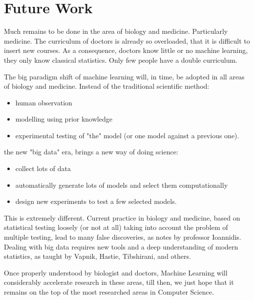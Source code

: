 \chapter{Future Work}
Much remains to be done in the area of biology and medicine. Particularly medicine. The curriculum of doctors is already so overloaded, that it is difficult to insert new courses. As a consequence, doctors know little or no machine learning, they only know classical statistics. Only few people have a double curriculum.

The big paradigm shift of machine learning will, in time, be adopted in all areas of biology and medicine. Instead of the traditional scientific method:
\begin{itemize}
\item human observation
\item modelling using prior knowledge
\item experimental testing of "the" model (or one model against a previous one).
\end{itemize}
the new "big data" era, brings a new way of doing science:
\begin{itemize}
\item collect lots of data
\item automatically generate lots of models and select them computationally
\item design new experiments to test a few selected models.
\end{itemize}
This is extremely different. Current practice in biology and medicine, based on statistical testing loosely (or not at all) taking into account the problem of multiple testing, lead to many false discoveries, as notes by professor Ioannidis. Dealing with big data requires new tools and a deep understanding of modern statistics, as taught by Vapnik, Hastie, Tibshirani, and others.

Once properly understood by biologist and doctors, Machine Learning will considerably accelerate research in these areas, till then, we just hope that it remains on the top of the most researched areas in Computer Science.
